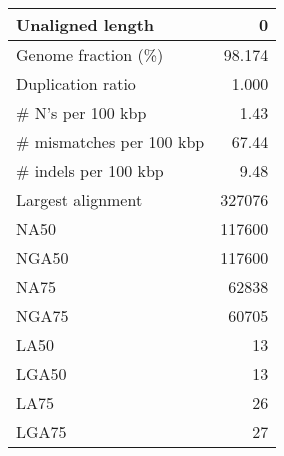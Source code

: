\documentclass[12pt,a4paper]{article}
\begin{document}
\begin{table}[ht]
\begin{center}
\begin{tabular}{|l*{1}{|r}|}
Unaligned length & 0 \\ \hline
Genome fraction (\%) & 98.174 \\ \hline
Duplication ratio & 1.000 \\ \hline
\# N's per 100 kbp & 1.43 \\ \hline
\# mismatches per 100 kbp & 67.44 \\ \hline
\# indels per 100 kbp & 9.48 \\ \hline
Largest alignment & 327076 \\ \hline
NA50 & 117600 \\ \hline
NGA50 & 117600 \\ \hline
NA75 & 62838 \\ \hline
NGA75 & 60705 \\ \hline
LA50 & 13 \\ \hline
LGA50 & 13 \\ \hline
LA75 & 26 \\ \hline
LGA75 & 27 \\ \hline
\end{tabular}
\end{center}
\end{table}
\end{document}
